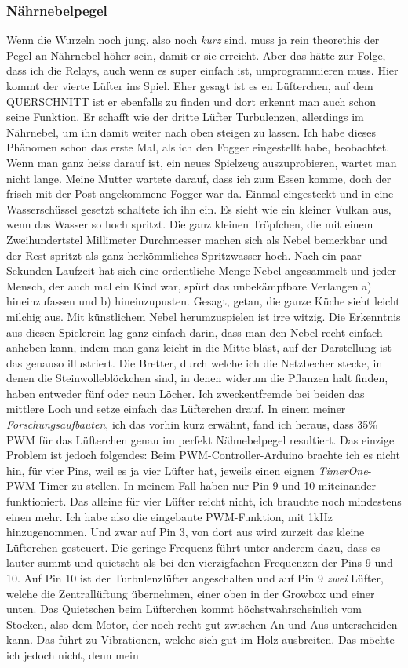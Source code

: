 \documentclass[12pt,titlepage,a4paper]{article}
\begin{document}
\subsubsection{Nährnebelpegel}
Wenn die Wurzeln noch jung, also noch \textit{kurz} sind, muss ja rein theorethis der Pegel an Nährnebel höher sein, damit er sie erreicht. Aber das hätte zur Folge, dass ich die Relays, auch wenn es super einfach ist, umprogrammieren muss. Hier kommt der vierte Lüfter ins Spiel. Eher gesagt ist es en Lüfterchen, auf dem QUERSCHNITT ist er ebenfalls zu finden und dort erkennt man auch schon seine Funktion. Er schafft wie der dritte Lüfter Turbulenzen, allerdings im Nährnebel, um ihn damit weiter nach oben steigen zu lassen. Ich habe dieses Phänomen schon das erste Mal, als ich den Fogger eingestellt habe, beobachtet. Wenn man ganz heiss darauf ist, ein neues Spielzeug auszuprobieren, wartet man nicht lange. Meine Mutter wartete darauf, dass ich zum Essen komme, doch der frisch mit der Post angekommene Fogger war da. Einmal eingesteckt und in eine Wasserschüssel gesetzt schaltete ich ihn ein. Es sieht wie ein kleiner Vulkan aus, wenn das Wasser so hoch spritzt. Die ganz kleinen Tröpfchen, die mit einem Zweihundertstel Millimeter Durchmesser machen sich als Nebel bemerkbar und der Rest spritzt als ganz herkömmliches Spritzwasser hoch. Nach ein paar Sekunden Laufzeit hat sich eine ordentliche Menge Nebel angesammelt und jeder Mensch, der auch mal ein Kind war, spürt das unbekämpfbare Verlangen a) hineinzufassen und b) hineinzupusten. Gesagt, getan, die ganze Küche sieht leicht milchig aus. Mit künstlichem Nebel herumzuspielen ist irre witzig. Die Erkenntnis aus diesen Spielerein lag ganz einfach darin, dass man den Nebel recht einfach anheben kann, indem man ganz leicht in die Mitte bläst, auf der Darstellung ist das genauso illustriert. Die Bretter, durch welche ich die Netzbecher stecke, in denen die Steinwolleblöckchen sind, in denen widerum die Pflanzen halt finden, haben entweder fünf oder neun Löcher. Ich zweckentfremde  bei beiden das mittlere Loch und setze einfach das Lüfterchen drauf. In einem meiner \textit{Forschungsaufbauten}, ich das vorhin kurz erwähnt, fand ich heraus, dass 35\% PWM für das Lüfterchen genau im perfekt Nähnebelpegel resultiert. Das einzige Problem ist jedoch folgendes: Beim PWM-Controller-Arduino brachte ich es nicht hin, für vier Pins, weil es ja vier Lüfter hat, jeweils einen eignen \textit{TimerOne}-PWM-Timer zu stellen. In meinem Fall haben nur Pin 9 und 10 miteinander funktioniert. Das alleine für vier Lüfter reicht nicht, ich brauchte noch mindestens einen mehr. Ich habe also die eingebaute PWM-Funktion, mit 1kHz hinzugenommen. Und zwar auf Pin 3, von dort aus wird zurzeit das kleine Lüfterchen gesteuert. Die geringe Frequenz führt unter anderem dazu, dass es lauter summt und quietscht als bei den vierzigfachen Frequenzen der Pins 9 und 10. Auf Pin 10 ist der Turbulenzlüfter angeschalten und auf Pin 9 \textit{zwei} Lüfter, welche die Zentrallüftung übernehmen, einer oben in der Growbox und einer unten. Das Quietschen beim Lüfterchen kommt höchstwahrscheinlich vom Stocken, also dem Motor, der noch recht gut zwischen An und Aus unterscheiden kann. Das führt zu Vibrationen, welche sich gut im Holz ausbreiten. Das möchte ich jedoch nicht, denn mein 
\end{document}
